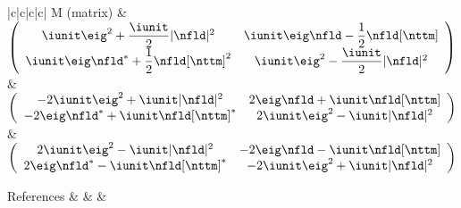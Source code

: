 \begin{table*}[p]
\begin{tabu}{|c|c|c|c|}
        M (matrix) &
        $\left( \begin{array}{cc} \iunit\eig^2 + \dfrac{\iunit}{2}|\nfld|^2 &
          \iunit\eig\nfld - \dfrac{1}{2}\nfld[\nttm]  \\
          \iunit\eig\nfld^* + \dfrac{1}{2}\nfld[\nttm]^2 &
          \iunit \eig^2 - \dfrac{\iunit}{2}|\nfld|^2 \end{array}\right)$ &
        $\left( \begin{array}{cc} -2\iunit\eig^2 + \iunit|\nfld|^2 &
          2\eig\nfld + \iunit\nfld[\nttm] \\
          - 2\eig\nfld^* + \iunit\nfld[\nttm]^* &
          2\iunit\eig^2 - \iunit|\nfld|^2 \end{array}\right)$ &
        $\left( \begin{array}{cc} 2\iunit\eig^2 - \iunit|\nfld|^2 &
          - 2\eig\nfld - \iunit\nfld[\nttm] \\
          2\eig\nfld^* - \iunit\nfld[\nttm]^* &
          - 2\iunit\eig^2 + \iunit|\nfld|^2 \end{array}\right)$
        \\ \hline


        References &
        \cite{Agrawal12_NonlinearFOs_Book,hasegawa1995solitons,
              Hasegawa,prilepsky2013nonlinear,desbruslais1996inverse} &
        \cite{ablowitz1974inverse,Yang10_Book,Buelow}  &
        \cite{Yousefi2014,Ablowitz2004a,Docksey2000a,hari2016multieigenvalue,
              tavakkolnia2015signalling}
        \\ \hline

        \end{tabu}
  \caption{Three different version of the normalized \ac{NLSE} are presented in the table together with the corresponding change of variables. The Lax operator $\matL$, and the Lax pair $\matP, \matM$ are reported for each of the normalization. The standard simplified notation for the partial derivatives is used, and the explicit dependency on $\nssp$ and $\nttm$ is omitted}
  \label{tab:normalizations_comparison}
\end{table*}
